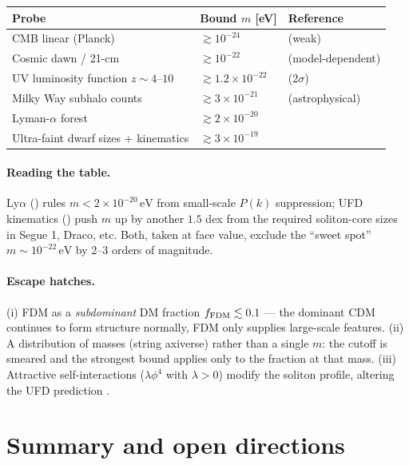 \documentclass[12pt]{article}
\newcommand{\eV}{\,\mathrm{eV}}
\begin{document}
\begin{tabularx}{\linewidth}{@{}l l X@{}}
\toprule
Probe & Bound $m$ [eV] & Reference \\
\midrule
CMB linear (Planck)         & $\gtrsim 10^{-24}$
   & \citet{Marsh2016} (weak) \\
Cosmic dawn / 21-cm         & $\gtrsim 10^{-22}$
   & (model-dependent) \\
UV luminosity function $z\!\sim\!4$--$10$
                            & $\gtrsim 1.2\times 10^{-22}$
   & \citet{Schive2014b} (2$\sigma$) \\
Milky Way subhalo counts    & $\gtrsim 3\times 10^{-21}$
   & (astrophysical) \\
Lyman-$\alpha$ forest       & $\gtrsim 2\times 10^{-20}$
   & \citet{Rogers2021} \\
Ultra-faint dwarf sizes + kinematics
                            & $\gtrsim 3\times 10^{-19}$
   & \citet{Dalal2022} \\
\bottomrule
\end{tabularx}

\paragraph{Reading the table.}  Ly$\alpha$ (\citealt{Rogers2021})
rules $m<2\times 10^{-20}\eV$ from small-scale $P(k)$ suppression;
UFD kinematics (\citealt{Dalal2022}) push $m$ up by another
$1.5$ dex from the required soliton-core sizes in Segue 1, Draco,
etc.  Both, taken at face value, exclude the ``sweet spot''
$m\sim 10^{-22}\eV$ by 2--3 orders of magnitude.

\paragraph{Escape hatches.}  (i) FDM as a \emph{subdominant} DM
fraction $f_{\rm FDM}\lesssim 0.1$ --- the dominant CDM continues to
form structure normally, FDM only supplies large-scale features.
(ii) A distribution of masses (string axiverse) rather than a single
$m$: the cutoff is smeared and the strongest bound applies only to
the fraction at that mass.  (iii) Attractive self-interactions
($\lambda\phi^4$ with $\lambda>0$) modify the soliton profile,
altering the UFD prediction \citep{Mocz2023}.

\section{Summary and open directions}
\label{sec:summary}
\end{document}
